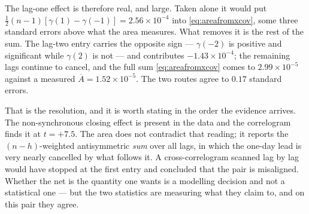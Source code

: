 The lag-one effect is therefore real, and large. Taken alone it would put
$\tfrac12(n-1)[\gamma(1)-\gamma(-1)] = 2.56\times10^{-4}$ into \eqref{eq:areafromxcov}, some three
standard errors above what the area measures. What removes it is the rest of the sum. The lag-two
entry carries the opposite sign --- $\gamma(-2)$ is positive and significant while $\gamma(2)$ is
not --- and contributes $-1.43\times10^{-4}$; the remaining lags continue to cancel, and the full
sum \eqref{eq:areafromxcov} comes to $2.99\times10^{-5}$ against a measured
$\overline{A}=1.52\times10^{-5}$. The two routes agree to $0.17$ standard errors.

That is the resolution, and it is worth stating in the order the evidence arrives. The
non-synchronous closing effect is present in the data and the correlogram finds it at $t=+7.5$. The
area does not contradict that reading; it reports the $(n-h)$-weighted antisymmetric \emph{sum} over
all lags, in which the one-day lead is very nearly cancelled by what follows it. A cross-correlogram
scanned lag by lag would have stopped at the first entry and concluded that the pair is
misaligned. Whether the net is the quantity one wants is a modelling decision and not a statistical
one --- but the two statistics are measuring what they claim to, and on this pair they agree. 





